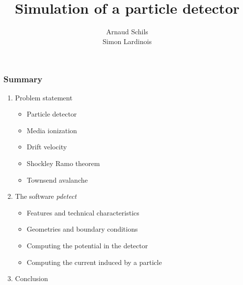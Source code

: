 \documentclass[14pt]{beamer}
\begin{document}
  {
\begin{frame}

\title{Simulation of a particle detector}
\author{Arnaud Schils \\ Simon Lardinois}
\maketitle

\end{frame}
}

\begin{frame}
\frametitle{Summary}

\begin{enumerate}
  \setlength\itemsep{1.4em}
  \item Problem statement
  \begin{itemize}
    \fontsize{13pt}{10}\selectfont

    \item Particle detector
    \item Media ionization
    \item Drift velocity
    \item Shockley Ramo theorem
    \item Townsend avalanche
  \end{itemize}
  \item The software \textit{pdetect}
  \begin{itemize}
    \fontsize{13pt}{10}\selectfont

    \item Features and technical characteristics
    \item Geometries and boundary conditions
    \item Computing the potential in the detector
    \item Computing the current induced by a particle
  \end{itemize}
  \item Conclusion
\end{enumerate}
\end{frame}
\end{document}
